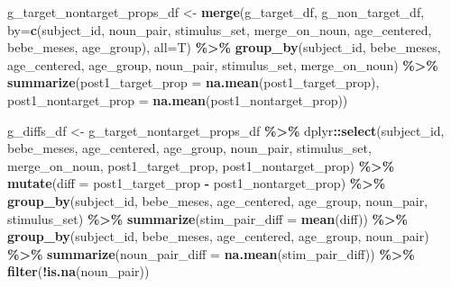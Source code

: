 \documentclass[
  doc,floatsintext]{apa6}
\newenvironment{Shaded}{\begin{snugshade}}{\end{snugshade}}
\newcommand{\AttributeTok}[1]{\textcolor[rgb]{0.13,0.29,0.53}{#1}}
\newcommand{\FunctionTok}[1]{\textcolor[rgb]{0.13,0.29,0.53}{\textbf{#1}}}
\newcommand{\NormalTok}[1]{#1}
\newcommand{\OtherTok}[1]{\textcolor[rgb]{0.56,0.35,0.01}{#1}}
\newcommand{\SpecialCharTok}[1]{\textcolor[rgb]{0.81,0.36,0.00}{\textbf{#1}}}
\newcommand{\StringTok}[1]{\textcolor[rgb]{0.31,0.60,0.02}{#1}}
\begin{document}
\begin{Shaded}
\begin{Highlighting}[]
\NormalTok{g\_target\_nontarget\_props\_df }\OtherTok{\textless{}{-}} \FunctionTok{merge}\NormalTok{(g\_target\_df, g\_non\_target\_df, }
                                      \AttributeTok{by=}\FunctionTok{c}\NormalTok{(}\StringTok{\textquotesingle{}subject\_id\textquotesingle{}}\NormalTok{, }
                                           \StringTok{\textquotesingle{}noun\_pair\textquotesingle{}}\NormalTok{,}
                                           \StringTok{\textquotesingle{}stimulus\_set\textquotesingle{}}\NormalTok{,}
                                           \StringTok{\textquotesingle{}merge\_on\_noun\textquotesingle{}}\NormalTok{,}
                                           \StringTok{\textquotesingle{}age\_centered\textquotesingle{}}\NormalTok{,}
                                           \StringTok{\textquotesingle{}bebe\_meses\textquotesingle{}}\NormalTok{,}
                                           \StringTok{\textquotesingle{}age\_group\textquotesingle{}}\NormalTok{), }\AttributeTok{all=}\NormalTok{T) }\SpecialCharTok{\%\textgreater{}\%}
  \FunctionTok{group\_by}\NormalTok{(subject\_id, bebe\_meses, age\_centered, age\_group,}
\NormalTok{           noun\_pair, stimulus\_set, merge\_on\_noun) }\SpecialCharTok{\%\textgreater{}\%}
  \FunctionTok{summarize}\NormalTok{(}\AttributeTok{post1\_target\_prop =} \FunctionTok{na.mean}\NormalTok{(post1\_target\_prop),}
            \AttributeTok{post1\_nontarget\_prop =} \FunctionTok{na.mean}\NormalTok{(post1\_nontarget\_prop))}

\NormalTok{g\_diffs\_df }\OtherTok{\textless{}{-}}\NormalTok{  g\_target\_nontarget\_props\_df }\SpecialCharTok{\%\textgreater{}\%}
\NormalTok{  dplyr}\SpecialCharTok{::}\FunctionTok{select}\NormalTok{(subject\_id, bebe\_meses, age\_centered, age\_group,}
\NormalTok{                noun\_pair, stimulus\_set, merge\_on\_noun, }
\NormalTok{                post1\_target\_prop,}
\NormalTok{                post1\_nontarget\_prop) }\SpecialCharTok{\%\textgreater{}\%}
  \FunctionTok{mutate}\NormalTok{(}\AttributeTok{diff =}\NormalTok{ post1\_target\_prop }\SpecialCharTok{{-}}\NormalTok{ post1\_nontarget\_prop) }\SpecialCharTok{\%\textgreater{}\%}
  \FunctionTok{group\_by}\NormalTok{(subject\_id, }
\NormalTok{           bebe\_meses, age\_centered, age\_group, }
\NormalTok{           noun\_pair, stimulus\_set) }\SpecialCharTok{\%\textgreater{}\%}
  \FunctionTok{summarize}\NormalTok{(}\AttributeTok{stim\_pair\_diff =} \FunctionTok{mean}\NormalTok{(diff)) }\SpecialCharTok{\%\textgreater{}\%}
  \FunctionTok{group\_by}\NormalTok{(subject\_id, bebe\_meses, age\_centered, age\_group, noun\_pair) }\SpecialCharTok{\%\textgreater{}\%}
  \FunctionTok{summarize}\NormalTok{(}\AttributeTok{noun\_pair\_diff =} \FunctionTok{na.mean}\NormalTok{(stim\_pair\_diff)) }\SpecialCharTok{\%\textgreater{}\%}
         \FunctionTok{filter}\NormalTok{(}\SpecialCharTok{!}\FunctionTok{is.na}\NormalTok{(noun\_pair))}


\end{Highlighting}
\end{Shaded}
\end{document}
